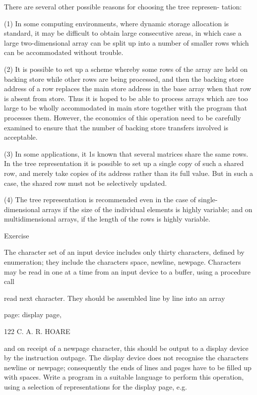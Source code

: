 {{{			There are several other possible reasons for choosing the tree represen- tation:
			
			(1) In some computing environments, where dynamic storage allocation is standard, it may be difficult to obtain large consecutive areas, in which case a large two-dimensional array can be split up into a number of smaller rows which can be accommodated without trouble.
			
			(2) It is possible to set up a scheme whereby some rows of the array are held on backing store while other rows are being processed, and then the backing store address of a row replaces the main store address in the base array when that row is absent from store. Thus it is hoped to be able to process arrays which are too large to be wholly accommodated in main store together with the program that processes them. However, the economics of this operation need to be carefully examined to ensure that the number of backing store transfers involved is acceptable.
			
			(3) In some applications, it 1s known that several matrices share the same rows. In the tree representation it is possible to set up a single copy of such a shared row, and merely take copies of its address rather than its full value. But in such a case, the shared row must not be selectively updated.
			
			(4) The tree representation is recommended even in the case of single- dimensional arrays if the size of the individual elements is highly variable; and on multidimensional arrays, if the length of the rows is highly variable.
			
			Exercise
			
			The character set of an input device includes only thirty characters, defined by enumeration; they include the characters space, newline, newpage. Characters may be read in one at a time from an input device to a buffer, using a procedure call
			
			read next character. They should be assembled line by line into an array
			
			page: display page,
			
			122 C. A. R. HOARE
			
			and on receipt of a newpage character, this should be output to a display device by the instruction outpage. The display device does not recognise the characters newline or newpage; consequently the ends of lines and pages have to be filled up with spaces. Write a program in a suitable language to perform this operation, using a selection of representations for the display page, e.g.
			
}}}
